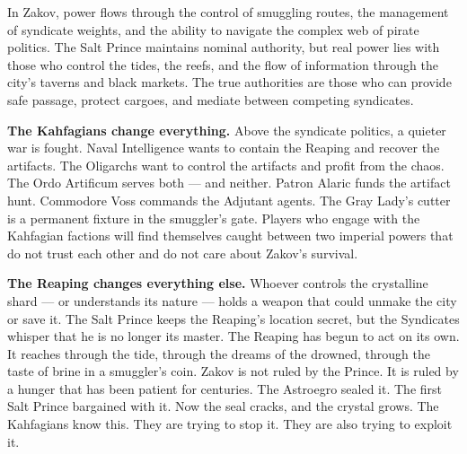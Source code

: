 \begin{tcolorbox}[colback=black!3,colframe=black!40!white,title={Patronage \& Power},breakable]
In Zakov, power flows through the control of smuggling routes, the management of syndicate weights, and the ability to navigate the complex web of pirate politics. The Salt Prince maintains nominal authority, but real power lies with those who control the tides, the reefs, and the flow of information through the city's taverns and black markets. The true authorities are those who can provide safe passage, protect cargoes, and mediate between competing syndicates.

\vspace{2mm}
\textbf{The Kahfagians change everything.}  
Above the syndicate politics, a quieter war is fought. Naval Intelligence wants to contain the Reaping and recover the artifacts. The Oligarchs want to control the artifacts and profit from the chaos. The Ordo Artificum serves both --- and neither. Patron Alaric funds the artifact hunt. Commodore Voss commands the Adjutant agents. The Gray Lady's cutter is a permanent fixture in the smuggler's gate. Players who engage with the Kahfagian factions will find themselves caught between two imperial powers that do not trust each other and do not care about Zakov's survival.

\vspace{2mm}
\textbf{The Reaping changes everything else.}  
Whoever controls the crystalline shard --- or understands its nature --- holds a weapon that could unmake the city or save it. The Salt Prince keeps the Reaping's location secret, but the Syndicates whisper that he is no longer its master. The Reaping has begun to act on its own. It reaches through the tide, through the dreams of the drowned, through the taste of brine in a smuggler's coin. Zakov is not ruled by the Prince. It is ruled by a hunger that has been patient for centuries. The Astroegro sealed it. The first Salt Prince bargained with it. Now the seal cracks, and the crystal grows. The Kahfagians know this. They are trying to stop it. They are also trying to exploit it.


\end{tcolorbox}
